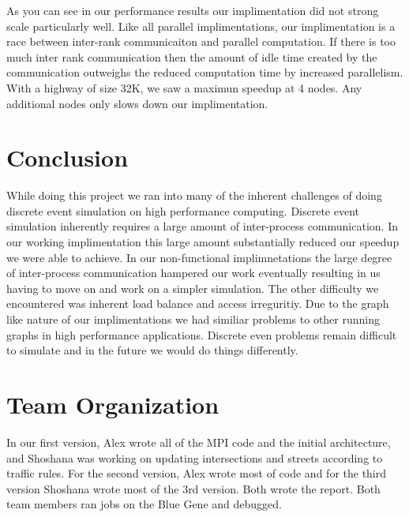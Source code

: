 \documentclass[10pt,a4paper]{article}
\begin{document}
    As you can see in our performance results our implimentation did not strong scale
    particularly well. Like all parallel implimentations, our implimentation is a race between inter-rank communicaiton and parallel computation. If there is too much inter rank communication then the amount of idle time created by the communication outweighs the reduced computation time by increased parallelism. With a highway of size 32K, we saw a maximun speedup at 4 nodes. Any additional nodes only slows down our implimentation.
    
    \section{Conclusion}
    While doing this project we ran into many of the inherent challenges of doing discrete event simulation on high performance computing. Discrete event simulation inherently requires a large amount of inter-process communication. In our working implimentation this large amount substantially reduced our speedup we were able to achieve. In our non-functional implimnetations the large degree of inter-process communication hampered our work eventually resulting in us having to move on and work on a simpler simulation. The other difficulty we encountered was inherent load balance and access irreguritiy. Due to the graph like nature of our implimentations we had similiar problems to other running graphs in high performance applications. Discrete even problems remain difficult to simulate and in the future we would do things differently.
    
    \section{Team Organization}
    
    In our first version, Alex wrote all of the MPI code and the initial architecture, and Shoshana was working on updating intersections and streets according to traffic rules. For the second version, Alex wrote most of code and for the third version Shoshana wrote most of the 3rd version. Both wrote the report. Both team members ran jobs on the Blue Gene and debugged.
    
    \medskip
     
    \printbibliography
    
    
    
\end{document}
